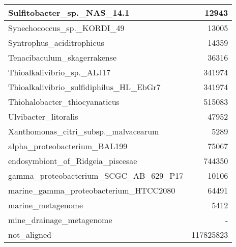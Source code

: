 \documentclass[12pt,a4paper]{article}
\begin{document}
\begin{table}[ht]
\begin{center}
\begin{tabular}{|l*{1}{|r}|}
Sulfitobacter\_sp.\_NAS\_14.1 & 12943 \\ \hline
Synechococcus\_sp.\_KORDI\_49 & 13005 \\ \hline
Syntrophus\_aciditrophicus & 14359 \\ \hline
Tenacibaculum\_skagerrakense & 36316 \\ \hline
Thioalkalivibrio\_sp.\_ALJ17 & 341974 \\ \hline
Thioalkalivibrio\_sulfidiphilus\_HL\_EbGr7 & 341974 \\ \hline
Thiohalobacter\_thiocyanaticus & 515083 \\ \hline
Ulvibacter\_litoralis & 47952 \\ \hline
Xanthomonas\_citri\_subsp.\_malvacearum & 5289 \\ \hline
alpha\_proteobacterium\_BAL199 & 75067 \\ \hline
endosymbiont\_of\_Ridgeia\_piscesae & 744350 \\ \hline
gamma\_proteobacterium\_SCGC\_AB\_629\_P17 & 10106 \\ \hline
marine\_gamma\_proteobacterium\_HTCC2080 & 64491 \\ \hline
marine\_metagenome & 5412 \\ \hline
mine\_drainage\_metagenome & - \\ \hline
not\_aligned & 117825823 \\ \hline
\end{tabular}
\end{center}
\end{table}
\end{document}
